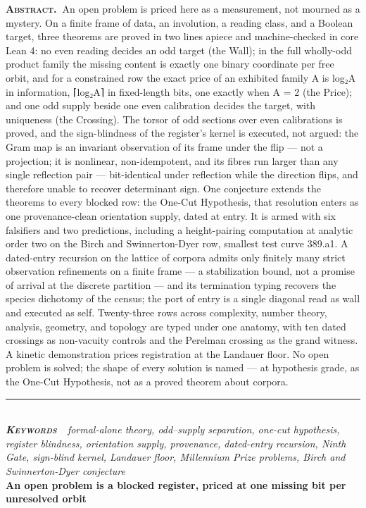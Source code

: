 \documentclass[10pt]{article}
\renewcommand{\_}{\origunderscore\allowbreak}
\begin{document}
{\small\hspace{1em}\textbf{\scshape\color{deep}Abstract.\ }An open
problem is priced here as a measurement, not mourned as a mystery. On a
finite frame of data, an involution, a reading class, and a Boolean
target, three theorems are proved in two lines apiece and
machine-checked in core Lean 4: no even reading decides an odd target
(the Wall); in the full wholly-odd product family the missing content is
exactly one binary coordinate per free orbit, and for a constrained row
the exact price of an exhibited family A is log₂\textbar A\textbar{} in
information, ⌈log₂\textbar A\textbar⌉ in fixed-length bits, one exactly
when \textbar A\textbar{} = 2 (the Price); and one odd supply beside one
even calibration decides the target, with uniqueness (the Crossing). The
torsor of odd sections over even calibrations is proved, and the
sign-blindness of the register's kernel is executed, not argued: the
Gram map is an invariant observation of its frame under the flip --- not
a projection; it is nonlinear, non-idempotent, and its fibres run larger
than any single reflection pair --- bit-identical under reflection while
the direction flips, and therefore unable to recover determinant sign.
One conjecture extends the theorems to every blocked row: the One-Cut
Hypothesis, that resolution enters as one provenance-clean orientation
supply, dated at entry. It is armed with six falsifiers and two
predictions, including a height-pairing computation at analytic order
two on the Birch and Swinnerton-Dyer row, smallest test curve 389.a1. A
dated-entry recursion on the lattice of corpora admits only finitely
many strict observation refinements on a finite frame --- a
stabilization bound, not a promise of arrival at the discrete partition
--- and its termination typing recovers the species dichotomy of the
census; the port of entry is a single diagonal read as wall and executed
as self. Twenty-three rows across complexity, number theory, analysis,
geometry, and topology are typed under one anatomy, with ten dated
crossings as non-vacuity controls and the Perelman crossing as the grand
witness. A kinetic demonstration prices registration at the Landauer
floor. No open problem is solved; the shape of every solution is named
--- at hypothesis grade, as the One-Cut Hypothesis, not as a proved
theorem about corpora.}\\[4pt]
{\color{accent}\rule{\textwidth}{0.6pt}}\\[3pt]
{\itshape\footnotesize\color{faint}\textbf{\upshape\scshape\color{deep}Keywords\ }\ formal-alone
theory, odd--supply separation, one-cut hypothesis, register blindness,
orientation supply, provenance, dated-entry recursion, Ninth Gate,
sign-blind kernel, Landauer floor, Millennium Prize problems, Birch and
Swinnerton-Dyer conjecture}\\[12pt]
\thispagestyle{fancy}
\textbf{An open problem is a blocked register, priced at one missing bit
per unresolved orbit}
\end{document}

